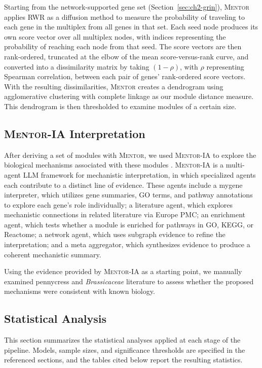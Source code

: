 Starting from the network-supported gene set (Section~\ref{sec:ch2-grin}), \textsc{Mentor} applies RWR as a diffusion method to measure the probability of traveling to each gene in the multiplex from all genes in that set. Each seed node produces its own score vector over all multiplex nodes, with indices representing the probability of reaching each node from that seed. The score vectors are then rank-ordered, truncated at the elbow of the mean score-versus-rank curve, and converted into a dissimilarity matrix by taking $(1 - \rho)$, with $\rho$ representing Spearman correlation, between each pair of genes' rank-ordered score vectors. With the resulting dissimilarities, \textsc{Mentor} creates a dendrogram using agglomerative clustering with complete linkage as our module distance measure. This dendrogram is then thresholded to examine modules of a certain size.

\subsection{\textsc{Mentor-IA} Interpretation}\label{sec:ch2-mentor-ia}
After deriving a set of modules with \textsc{Mentor}, we used \textsc{Mentor-IA} to explore the biological mechanisms associated with these modules \cite{mentor-ia}. \textsc{Mentor-IA} is a multi-agent LLM framework for mechanistic interpretation, in which specialized agents each contribute to a distinct line of evidence. These agents include a mygene interpreter, which utilizes gene summaries, GO terms, and pathway annotations to explore each gene's role individually; a literature agent, which explores mechanistic connections in related literature via Europe PMC; an enrichment agent, which tests whether a module is enriched for pathways in GO, KEGG, or Reactome; a network agent, which uses subgraph evidence to refine the interpretation; and a meta aggregator, which synthesizes evidence to produce a coherent mechanistic summary.

Using the evidence provided by \textsc{Mentor-IA} as a starting point, we manually examined pennycress and \textit{Brassicaceae} literature to assess whether the proposed mechanisms were consistent with known biology.

\subsection{Statistical Analysis}
This section summarizes the statistical analyses applied at each stage of the pipeline. Models, sample sizes, and significance thresholds are specified in the referenced sections, and the tables cited below report the resulting statistics.

